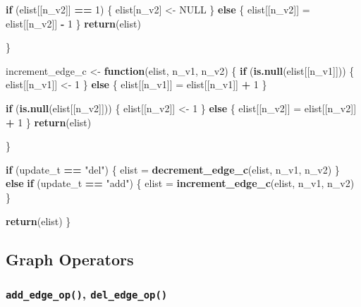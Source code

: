 \documentclass[11pt,a4paper]{article}
\newenvironment{Shaded}{\begin{snugshade}}{\end{snugshade}}
\newcommand{\ControlFlowTok}[1]{\textcolor[rgb]{0.13,0.29,0.53}{\textbf{#1}}}
\newcommand{\DecValTok}[1]{\textcolor[rgb]{0.00,0.00,0.81}{#1}}
\newcommand{\KeywordTok}[1]{\textcolor[rgb]{0.13,0.29,0.53}{\textbf{#1}}}
\newcommand{\NormalTok}[1]{#1}
\newcommand{\OperatorTok}[1]{\textcolor[rgb]{0.81,0.36,0.00}{\textbf{#1}}}
\newcommand{\OtherTok}[1]{\textcolor[rgb]{0.56,0.35,0.01}{#1}}
\newcommand{\StringTok}[1]{\textcolor[rgb]{0.31,0.60,0.02}{#1}}
\begin{document}
\begin{Shaded}
\begin{Highlighting}[]
    \ControlFlowTok{if}\NormalTok{ (elist[[n_v2]] }\OperatorTok{==}\StringTok{ }\DecValTok{1}\NormalTok{) \{}
\NormalTok{      elist[n_v2] <-}\StringTok{ }\OtherTok{NULL}
\NormalTok{    \} }\ControlFlowTok{else}\NormalTok{ \{}
\NormalTok{      elist[[n_v2]] =}\StringTok{ }\NormalTok{elist[[n_v2]] }\OperatorTok{-}\StringTok{ }\DecValTok{1}
\NormalTok{    \}}
    \KeywordTok{return}\NormalTok{(elist)}
    
\NormalTok{  \}}
  
\NormalTok{  increment_edge_c <-}\StringTok{ }\ControlFlowTok{function}\NormalTok{(elist, n_v1, n_v2) \{}
    \ControlFlowTok{if}\NormalTok{ (}\KeywordTok{is.null}\NormalTok{(elist[[n_v1]])) \{}
\NormalTok{      elist[[n_v1]] <-}\StringTok{ }\DecValTok{1}
\NormalTok{    \} }\ControlFlowTok{else}\NormalTok{ \{}
\NormalTok{      elist[[n_v1]] =}\StringTok{ }\NormalTok{elist[[n_v1]] }\OperatorTok{+}\StringTok{ }\DecValTok{1}
\NormalTok{    \}}
    
    \ControlFlowTok{if}\NormalTok{ (}\KeywordTok{is.null}\NormalTok{(elist[[n_v2]])) \{}
\NormalTok{      elist[[n_v2]] <-}\StringTok{ }\DecValTok{1}
\NormalTok{    \} }\ControlFlowTok{else}\NormalTok{ \{}
\NormalTok{      elist[[n_v2]] =}\StringTok{ }\NormalTok{elist[[n_v2]] }\OperatorTok{+}\StringTok{ }\DecValTok{1}
\NormalTok{    \}}
    \KeywordTok{return}\NormalTok{(elist)}
    
\NormalTok{  \}}
  
  
  \ControlFlowTok{if}\NormalTok{ (update_t }\OperatorTok{==}\StringTok{ "del"}\NormalTok{) \{}
\NormalTok{    elist =}\StringTok{ }\KeywordTok{decrement_edge_c}\NormalTok{(elist, n_v1, n_v2)}
\NormalTok{  \} }\ControlFlowTok{else} \ControlFlowTok{if}\NormalTok{ (update_t }\OperatorTok{==}\StringTok{ "add"}\NormalTok{) \{}
\NormalTok{    elist =}\StringTok{ }\KeywordTok{increment_edge_c}\NormalTok{(elist, n_v1, n_v2)}
\NormalTok{  \}}
  
  \KeywordTok{return}\NormalTok{(elist)}
\NormalTok{\}}
\end{Highlighting}
\end{Shaded}

\hypertarget{graph-operators}{%
\subsection{Graph Operators}\label{graph-operators}}

\hypertarget{add_edge_op-del_edge_op}{%
\subsubsection{\texorpdfstring{\texttt{add\_edge\_op()},
\texttt{del\_edge\_op()}}{add\_edge\_op(), del\_edge\_op()}}\label{add_edge_op-del_edge_op}}
\end{document}
